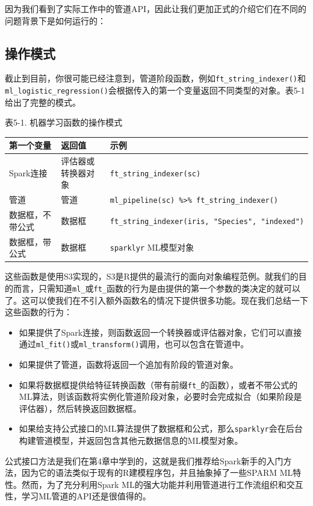 \documentclass[
]{article}
\begin{document}
因为我们看到了实际工作中的管道API，因此让我们更加正式的介绍它们在不同的问题背景下是如何运行的：

\hypertarget{ux64cdux4f5cux6a21ux5f0f}{%
\subsection{操作模式}\label{ux64cdux4f5cux6a21ux5f0f}}

截止到目前，你很可能已经注意到，管道阶段函数，例如\texttt{ft\_string\_indexer()}和\texttt{ml\_logistic\_regression()}会根据传入的第一个变量返回不同类型的对象。表5-1给出了完整的模式。

表5-1. 机器学习函数的操作模式

\begin{longtable}[]{@{}lll@{}}
\toprule
第一个变量 & 返回值 & 示例\tabularnewline
\midrule
\endhead
Spark连接 & 评估器或转换器对象 &
\texttt{ft\_string\_indexer(sc)}\tabularnewline
管道 & 管道 &
\texttt{ml\_pipeline(sc)\ \%\textgreater{}\%\ ft\_string\_indexer()}\tabularnewline
数据框，不带公式 & 数据框 &
\texttt{ft\_string\_indexer(iris,\ "Species",\ "indexed")}\tabularnewline
数据框，带公式 & 数据框 & \texttt{sparklyr} ML模型对象\tabularnewline
\bottomrule
\end{longtable}

这些函数是使用S3实现的，S3是R提供的最流行的面向对象编程范例。就我们的目的而言，只需知道\texttt{ml\_}或\texttt{ft\_}函数的行为是由提供的第一个参数的类决定的就可以了。这可以使我们在不引入额外函数名的情况下提供很多功能。现在我们总结一下这些函数的行为：

\begin{itemize}
\item
  如果提供了Spark连接，则函数返回一个转换器或评估器对象，它们可以直接通过\texttt{ml\_fit()}或\texttt{ml\_transform()}调用，也可以包含在管道中。
\item
  如果提供了管道，函数将返回一个追加有阶段的管道对象。
\item
  如果将数据框提供给特征转换函数（带有前缀\texttt{ft\_}的函数），或者不带公式的ML算法，则该函数将实例化管道阶段对象，必要时会完成拟合（如果阶段是评估器），然后转换返回数据框。
\item
  如果给支持公式接口的ML算法提供了数据框和公式，那么\texttt{sparklyr}会在后台构建管道模型，并返回包含其他元数据信息的ML模型对象。
\end{itemize}

公式接口方法是我们在第4章中学到的，这就是我们推荐给Spark新手的入门方法，因为它的语法类似于现有的R建模程序包，并且抽象掉了一些SPARM
ML特性。然而，为了充分利用Spark
ML的强大功能并利用管道进行工作流组织和交互性，学习ML管道的API还是很值得的。
\end{document}
